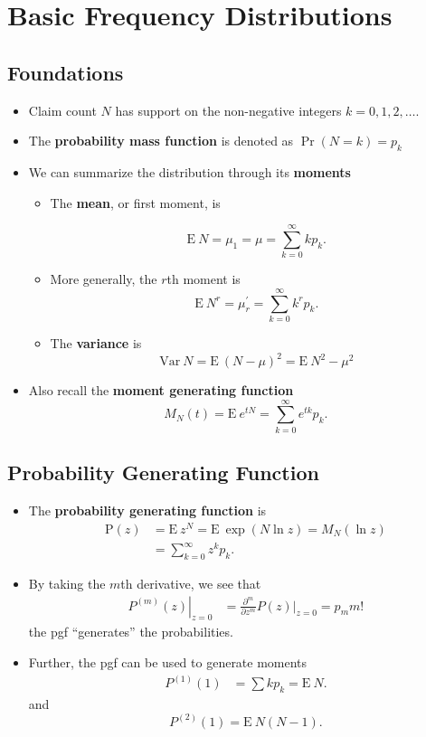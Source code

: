 \documentclass[]{book}
\theoremstyle{definition}
\theoremstyle{definition}
\theoremstyle{definition}
\theoremstyle{remark}
\begin{document}
\section{Basic Frequency
Distributions}\label{basic-frequency-distributions}

\subsection{Foundations}\label{foundations}

\begin{itemize}
\item
  Claim count \(N\) has support on the non-negative integers
  \(k=0,1,2, \ldots\).
\item
  The \textbf{probability mass function} is denoted as
  \(\Pr(N = k) = p_k\)
\item
  We can summarize the distribution through its \textbf{moments}

  \begin{itemize}
  \item
    The \textbf{mean}, or first moment, is

    \[\mathrm{E~} N = \mu_1 = \mu = \sum^{\infty}_{k=0} k p_k .\]
  \item
    More generally, the \(r\)th moment is
    \[\mathrm{E~} N^r = \mu_r^{\prime} = \sum^{\infty}_{k=0} k^r p_k .\]
  \item
    The \textbf{variance} is
    \[\mathrm{Var~} N = \mathrm{E~} (N-\mu)^2 = \mathrm{E~} N^2 - \mu^2\]
  \end{itemize}
\item
  Also recall the \textbf{moment generating function}
  \[M_N(t) = \mathrm{E~}e^{tN} = \sum^{\infty}_{k=0} e^{tk} p_k .\]
\end{itemize}

\subsection{Probability Generating
Function}\label{probability-generating-function}

\begin{itemize}
\item
  The \textbf{probability generating function} is \[\begin{aligned}
  \mathrm{P}(z) &= \mathrm{E~}z^N = \mathrm{E~}\exp{(N \ln z)} = M_N(\ln{z})\\
  &= \sum^{\infty}_{k=0} z^k p_k .\end{aligned}\]
\item
  By taking the \(m\)th derivative, we see that \[\begin{aligned}
  \left. P^{(m)}(z)\right|_{z=0} &= \frac{\partial^m }{\partial z^m} P(z)|_{z=0} = p_m m!\end{aligned}\]
  the pgf ``generates'' the probabilities.
\item
  Further, the pgf can be used to generate moments \[\begin{aligned}
  P^{(1)}(1) &= \sum k p_k = \mathrm{E~}N .\end{aligned}\] and
  \[P^{(2)}(1) = \mathrm{E~}N(N-1).\]
\end{itemize}
\end{document}
